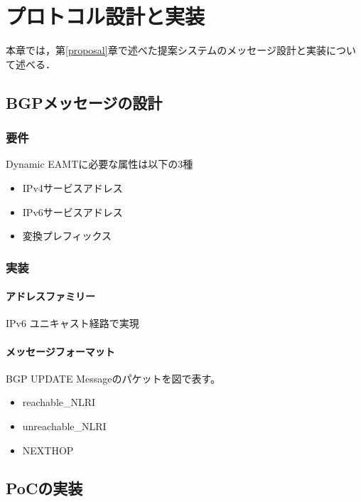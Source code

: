 \chapter{プロトコル設計と実装}
\label{implementation}
本章では，第\ref{proposal}章で述べた提案システムのメッセージ設計と実装について述べる．



\section{BGPメッセージの設計}
\subsection{要件}
Dynamic EAMTに必要な属性は以下の3種
\begin{itemize}
    \item IPv4サービスアドレス \\
    \item IPv6サービスアドレス \\
    \item 変換プレフィックス \\
\end{itemize}

\subsection{実装}
\subsubsection{アドレスファミリー}
IPv6 ユニキャスト経路で実現
\subsubsection{メッセージフォーマット}

BGP UPDATE Messageのパケットを図で表す。

\begin{itemize}
    \item reachable\_NLRI \\
    \item unreachable\_NLRI \\
    \item NEXTHOP \\
\end{itemize}


\section{PoCの実装}

